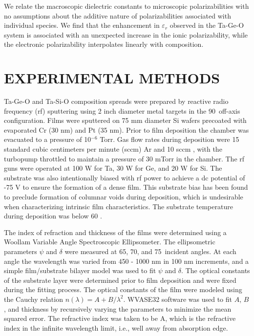 \documentclass[aip,jap,numerical,citeautoscript,preprint]{revtex4-1}
\begin{document}
We relate the macroscopic dielectric constants to microscopic polarizabilities with no assumptions about the additive nature of polarizabilities associated with individual species. We find that the enhancement in $\varepsilon_{r}$ observed in the Ta-Ge-O system is associated with an unexpected increase in the ionic polarizability, while the electronic polarizability interpolates linearly with composition.  
		
\section{EXPERIMENTAL METHODS}

Ta-Ge-O and Ta-Si-O composition spreads were prepared by reactive radio frequency (rf) sputtering using 2 inch diameter metal targets in the 90\textdegree \ off-axis configuration\cite{VanDover1998}. Films were sputtered on 75 mm diameter Si wafers precoated with evaporated Cr (30 nm) and Pt (35 nm). Prior to film deposition the chamber was evacuated to a pressure of 10$^{-6}$ Torr. Gas flow rates during deposition were 15 standard cubic centimeters per minute (sccm) Ar and 10 sccm , with the turbopump throttled to maintain a pressure of 30 mTorr in the chamber. The rf guns were operated at 100 W for Ta, 30 W for Ge, and 20 W for Si. The substrate was also intentionally biased with rf power to achieve a dc potential of -75 V to ensure the formation of a dense film. This substrate bias has been found to preclude formation of columnar voids during deposition\cite{Barron2009}, which is undesirable when characterizing intrinsic film characteristics. The substrate temperature during deposition was below 60 \textcelsius. 

The index of refraction and thickness of the films were determined using a Woollam Variable Angle Spectroscopic Ellipsometer. The ellipsometric parameters $\psi$ and $\delta$ were measured at 65, 70, and 75\textdegree \ incident angles. At each angle the wavelength was varied from 450 - 1000 nm in 100 nm increments, and a simple film/substrate bilayer model was used to fit $\psi$ and $\delta$. The optical constants of the substrate layer were determined prior to film deposition and were fixed during the fitting process. The optical constants of the film were modeled using the Cauchy relation $n(\lambda) =  A + B / \lambda^{2}$. WVASE32 software was used to fit $A$, $B$, and thickness by recursively varying the parameters to minimize the mean squared error. The refractive index was taken to be A, which is the refractive index in the infinite wavelength limit, i.e., well away from absorption edge.
\end{document}
